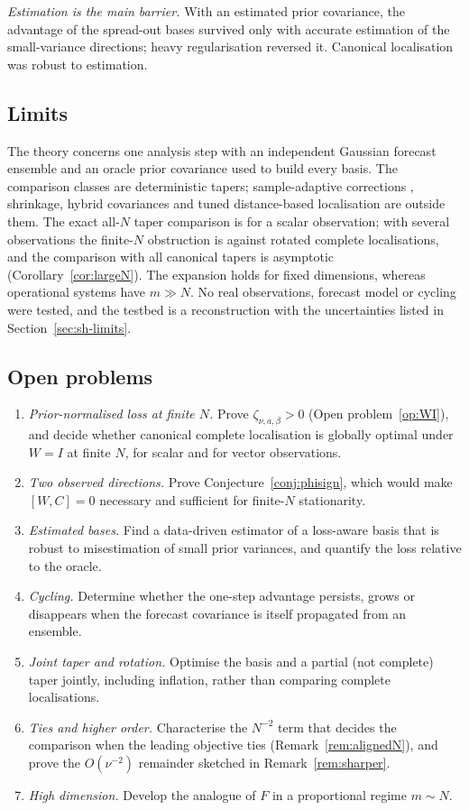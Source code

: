 \documentclass[11pt,a4paper]{article}
\numberwithin{equation}{section}
\theoremstyle{remark}\newtheorem{remark}[theorem]{Remark}
\begin{document}
\emph{Estimation is the main barrier.} With an estimated prior covariance, the advantage of the
spread-out bases survived only with accurate estimation of the small-variance directions;
heavy regularisation reversed it. Canonical localisation was robust to estimation.

\subsection{Limits}

The theory concerns one analysis step with an independent Gaussian forecast ensemble and an
oracle prior covariance used to build every basis. The comparison classes are deterministic
tapers; sample-adaptive corrections \cite{Anderson2012}, shrinkage, hybrid covariances and
tuned distance-based localisation are outside them. The exact all-\(N\) taper comparison is for a
scalar observation; with several observations the finite-\(N\) obstruction is against rotated
complete localisations, and the comparison with all canonical tapers is asymptotic
(Corollary~\ref{cor:largeN}). The expansion holds for fixed dimensions, whereas operational
systems have \(m\gg N\). No real observations, forecast model or cycling were tested, and the
testbed is a reconstruction with the uncertainties listed in Section~\ref{sec:sh-limits}.

\subsection{Open problems}

\begin{enumerate}
\item \emph{Prior-normalised loss at finite \(N\).} Prove \(\zeta_{\nu,a,\beta}>0\)
 (Open problem~\ref{op:WI}), and decide whether canonical complete localisation is globally
 optimal under \(W=I\) at finite \(N\), for scalar and for vector observations.
\item \emph{Two observed directions.} Prove Conjecture~\ref{conj:phisign}, which would make
 \([W,C]=0\) necessary and sufficient for finite-\(N\) stationarity.
\item \emph{Estimated bases.} Find a data-driven estimator of a loss-aware basis that is robust
 to misestimation of small prior variances, and quantify the loss relative to the oracle.
\item \emph{Cycling.} Determine whether the one-step advantage persists, grows or disappears
 when the forecast covariance is itself propagated from an ensemble.
\item \emph{Joint taper and rotation.} Optimise the basis and a partial (not complete) taper
 jointly, including inflation, rather than comparing complete localisations.
\item \emph{Ties and higher order.} Characterise the \(N^{-2}\) term that decides the comparison
 when the leading objective ties (Remark~\ref{rem:alignedN}), and prove the
 \(O(\nu^{-2})\) remainder sketched in Remark~\ref{rem:sharper}.
\item \emph{High dimension.} Develop the analogue of \(F\) in a proportional regime \(m\sim N\).
\end{enumerate}
\end{document}
